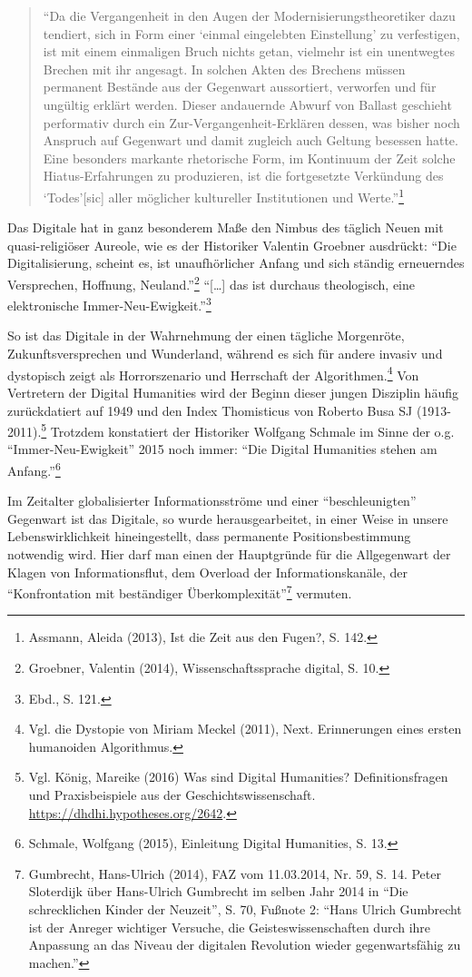 \documentclass[a4paper,
fontsize=11pt,
oneside,
numbers=noperiodatend,
parskip=half-,
bibliography=totoc,
final
]{scrartcl}
\begin{document}
\begin{quote}
\enquote{Da die Vergangenheit in den Augen der
Modernisierungstheoretiker dazu tendiert, sich in Form einer
\enquote{einmal eingelebten Einstellung} zu verfestigen, ist mit einem
einmaligen Bruch nichts getan, vielmehr ist ein unentwegtes Brechen mit
ihr angesagt. In solchen Akten des Brechens müssen permanent Bestände
aus der Gegenwart aussortiert, verworfen und für ungültig erklärt
werden. Dieser andauernde Abwurf von Ballast geschieht performativ durch
ein Zur-Vergangenheit-Erklären dessen, was bisher noch Anspruch auf
Gegenwart und damit zugleich auch Geltung besessen hatte. Eine besonders
markante rhetorische Form, im Kontinuum der Zeit solche
Hiatus-Erfahrungen zu produzieren, ist die fortgesetzte Verkündung des
\enquote{Todes}{[}sic{]} aller möglicher kultureller Institutionen und
Werte.}\footnote{Assmann, Aleida (2013), Ist die Zeit aus den Fugen?, S.
  142.}
\end{quote}

Das Digitale hat in ganz besonderem Maße den Nimbus des täglich Neuen
mit quasi-religiöser Aureole, wie es der Historiker Valentin Groebner
ausdrückt: \enquote{Die Digitalisierung, scheint es, ist unaufhörlicher
Anfang und sich ständig erneuerndes Versprechen, Hoffnung,
Neuland.}\footnote{Groebner, Valentin (2014), Wissenschaftssprache
  digital, S. 10.} \enquote{{[}\ldots{}{]} das ist durchaus theologisch,
eine elektronische Immer-Neu-Ewigkeit.}\footnote{Ebd., S. 121.}

So ist das Digitale in der Wahrnehmung der einen tägliche Morgenröte,
Zukunftsversprechen und Wunderland, während es sich für andere invasiv
und dystopisch zeigt als Horrorszenario und Herrschaft der
Algorithmen.\footnote{Vgl. die Dystopie von Miriam Meckel (2011), Next.
  Erinnerungen eines ersten humanoiden Algorithmus.} Von Vertretern der
Digital Humanities wird der Beginn dieser jungen Disziplin häufig
zurückdatiert auf 1949 und den Index Thomisticus von Roberto Busa SJ
(1913-2011).\footnote{Vgl. König, Mareike (2016) Was sind Digital
  Humanities? Definitionsfragen und Praxisbeispiele aus der
  Geschichtswissenschaft. \url{https://dhdhi.hypotheses.org/2642}.}
Trotzdem konstatiert der Historiker Wolfgang Schmale im Sinne der o.g.
\enquote{Immer-Neu-Ewigkeit} 2015 noch immer: \enquote{Die Digital
Humanities stehen am Anfang.}\footnote{Schmale, Wolfgang (2015),
  Einleitung Digital Humanities, S. 13.}

Im Zeitalter globalisierter Informationsströme und einer
\enquote{beschleunigten} Gegenwart ist das Digitale, so wurde
herausgearbeitet, in einer Weise in unsere Lebenswirklichkeit
hineingestellt, dass permanente Positionsbestimmung notwendig wird. Hier
darf man einen der Hauptgründe für die Allgegenwart der Klagen von
Informationsflut, dem Overload der Informationskanäle, der
\enquote{Konfrontation mit beständiger Überkomplexität}\footnote{Gumbrecht,
  Hans-Ulrich (2014), FAZ vom 11.03.2014, Nr. 59, S. 14. Peter
  Sloterdijk über Hans-Ulrich Gumbrecht im selben Jahr 2014 in
  \enquote{Die schrecklichen Kinder der Neuzeit}, S. 70, Fußnote 2:
  \enquote{Hans Ulrich Gumbrecht ist der Anreger wichtiger Versuche, die
  Geisteswissenschaften durch ihre Anpassung an das Niveau der digitalen
  Revolution wieder gegenwartsfähig zu machen.}} vermuten.
\end{document}
